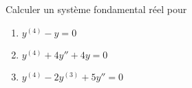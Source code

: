 
\begin{exercice}\label{exoEqsDiff0014}

Calculer un système fondamental réel pour
\begin{enumerate}
\item $  y^{(4)}-y = 0$
\item $  y^{(4)} +4y'' +4y = 0$
\item $  y^{(4)} -2y^{(3)} +5y'' = 0$
\end{enumerate}

\end{exercice}

